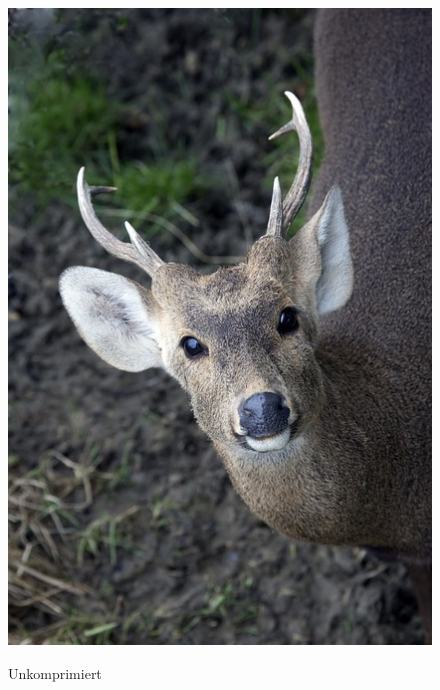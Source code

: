         \begin{multicols}{2}
            \begin{figure}[H]
                \begin{center}
                    \includegraphics[scale=1]{../pictures/gazelle-uncompressed.jpg}\\
                    \caption{Unkomprimiert}\label{fig:gazelle-uncompressed}
                \end{center}
            \end{figure}
            \par
            \begin{figure}[H]
                \begin{center}

\end{center}
\end{figure}
\end{multicols}

